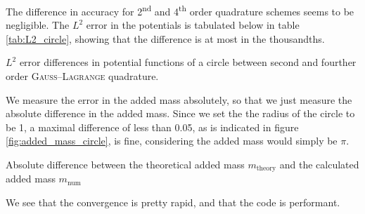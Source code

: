 \noindent
The difference in accuracy for 2\textsuperscript{nd} and 4\textsuperscript{th} order quadrature schemes seems to be negligible.
The $L^2$ error in the potentials is tabulated below in table \ref{tab:L2_circle}, showing that the difference is at most in the thousandths.
\begin{Figure}
  \centering
  \captionsetup{type = table}
  \caption{$L^2$ error differences in potential functions of a circle between second and fourther order \textsc{Gauss}--\textsc{Lagrange} quadrature.}
  \label{tab:L2_circle}
\end{Figure}

\noindent
We measure the error in the added mass absolutely, so that we just measure the absolute difference in the added mass.
Since we set the the radius of the circle to be 1, a maximal difference of less than 0.05, as is indicated in figure \ref{fig:added_mass_circle}, is fine, considering the added mass would simply be $\pi$.
\begin{Figure}
  \centering
  \resizebox{\textwidth}{!}{}
  \captionsetup{type = figure}
  \caption{Absolute difference between the theoretical added mass $m_{\mathrm{theory}}$ and the calculated added mass $m_{\mathrm{num}}$}
  \label{fig:added_mass_circle}
\end{Figure}

\noindent We see that the convergence is pretty rapid, and that the code is performant.
